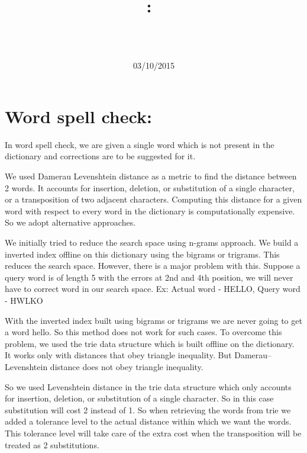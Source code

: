 \documentclass{article}
\title{
\vspace{2in}
\textmd{\textbf{\hmwkClass:\ \hmwkTitle}}\\
\vspace{0.1in}\large{\textit{\hmwkClassInstructor}}
\vspace{1in}
}
\author{\textbf{\hmwkAuthorNameA} \\ \textbf{\hmwkAuthorNameB} \\ \textbf{\hmwkAuthorNameC}}
\date{03/10/2015} %
\begin{document}
\maketitle
\pagebreak


\section{Word spell check:}
\par In word spell check, we are given a single word which is not present in the dictionary and corrections are to be suggested for it.
\par We used Damerau Levenshtein distance as a metric to find the distance between 2 words. It accounts for insertion, deletion, or substitution of a single character, or a transposition of two adjacent characters. Computing this distance for a given word with respect to every word in the dictionary is computationally expensive. So we adopt alternative approaches.\\
\par We initially tried to reduce the search space using n-grams approach. We build a inverted index offline on this dictionary using the bigrams or trigrams. This reduces the search space. However, there is a major problem with this. Suppose a query word is of length 5 with the errors at 2nd and 4th position, we will never have to correct word in our search space. 
Ex: Actual word - HELLO, Query word - HWLKO\\
\par With the inverted index built using  bigrams or  trigrams we are never going to get a word hello. So this method does not work for such cases. To overcome this problem, we used the trie data structure which is built offline on the dictionary. It works only with distances that obey triangle inequality. But Damerau–Levenshtein distance does not obey triangle inequality.\\
\par So we used Levenshtein distance in the trie data structure which only accounts for insertion, deletion, or substitution of a single character. So in this case substitution will cost 2 instead of 1. So when retrieving the words from trie we added a tolerance level to the actual distance within which we want the words. This tolerance level will take care of the extra cost when the transposition will be treated as 2 substitutions.\\
\end{document}
